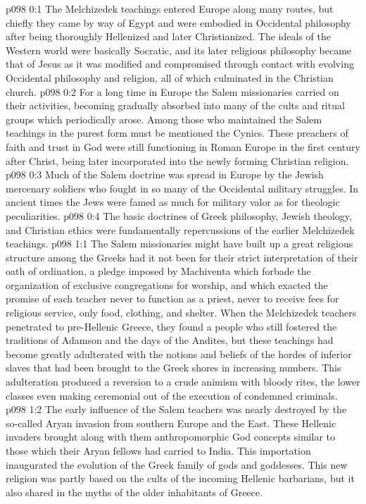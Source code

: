 \author{Melchizedek}
\vs p098 0:1 The Melchizedek teachings entered Europe along many routes, but chiefly they came by way of Egypt and were embodied in Occidental philosophy after being thoroughly Hellenized and later Christianized. The ideals of the Western world were basically Socratic, and its later religious philosophy became that of Jesus as it was modified and compromised through contact with evolving Occidental philosophy and religion, all of which culminated in the Christian church.
\vs p098 0:2 For a long time in Europe the Salem missionaries carried on their activities, becoming gradually absorbed into many of the cults and ritual groups which periodically arose. Among those who maintained the Salem teachings in the purest form must be mentioned the Cynics. These preachers of faith and trust in God were still functioning in Roman Europe in the first century after Christ, being later incorporated into the newly forming Christian religion.
\vs p098 0:3 Much of the Salem doctrine was spread in Europe by the Jewish mercenary soldiers who fought in so many of the Occidental military struggles. In ancient times the Jews were famed as much for military valor as for theologic peculiarities.\plusone
\vs p098 0:4 The basic doctrines of Greek philosophy, Jewish theology, and Christian ethics were fundamentally repercussions of the earlier Melchizedek teachings.
\vs p098 1:1 The Salem missionaries might have built up a great religious structure among the Greeks had it not been for their strict interpretation of their oath of ordination, a pledge imposed by Machiventa which forbade the organization of exclusive congregations for worship, and which exacted the promise of each teacher never to function as a priest, never to receive fees for religious service, only food, clothing, and shelter. When the Melchizedek teachers penetrated to pre\hyp{}Hellenic Greece, they found a people who still fostered the traditions of Adamson and the days of the Andites, but these teachings had become greatly adulterated with the notions and beliefs of the hordes of inferior slaves that had been brought to the Greek shores in increasing numbers. This adulteration produced a reversion to a crude animism with bloody rites, the lower classes even making ceremonial out of the execution of condemned criminals.
\vs p098 1:2 The early influence of the Salem teachers was nearly destroyed by the so\hyp{}called Aryan invasion from southern Europe and the East. These Hellenic invaders brought along with them anthropomorphic God concepts similar to those which their Aryan fellows had carried to India. This importation inaugurated the evolution of the Greek family of gods and goddesses. This new religion was partly based on the cults of the incoming Hellenic barbarians, but it also shared in the myths of the older inhabitants of Greece.
